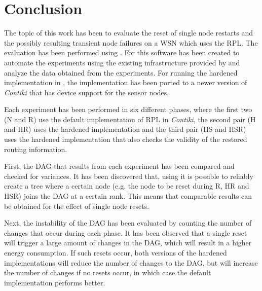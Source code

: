 \acresetall
\chapter{Conclusion}


The topic of this work has been to evaluate the reset of single node restarts
and the possibly resulting transient node failures on a \ac{WSN} which uses
the \ac{RPL}. The evaluation has been performed using \fitlab. For this software has
been created to automate the experiments using the existing infrastructure
provided by \fitlab and analyze the data obtained from the experiments. For
running the hardened implementation in \fitlab, the implementation has been
ported to a newer version of \emph{Contiki} that has device support for the
sensor nodes.

Each experiment has been performed in six different phases, where the first two
(N and R) use the default implementation of \ac{RPL} in \emph{Contiki}, the
second pair (H and HR) uses the hardened implementation \cite{mueller2017} and
the third pair (HS and HSR) uses the hardened implementation that also checks
the validity of the restored routing information.

First, the \ac{DAG} that results from each experiment has been compared and
checked for variances. It has been discovered that, using \fitlab it is possible
to reliably create a tree where a certain node (e.g. the node to be
reset during R, HR and HSR) joins the \ac{DAG} at a certain rank. This means
that comparable results can be obtained for the effect of single node resets.

Next, the instability of the \ac{DAG} has been evaluated by counting the number
of changes that occur during each phase. It has been observed that a single reset
will trigger a large amount of changes in the \ac{DAG}, which will result in a
higher energy consumption. If such resets occur, both versions of the hardened
implementations will reduce the  number of changes to the
\ac{DAG}, but will increase the number of changes if no resets occur, in which
case the default implementation performs better.


